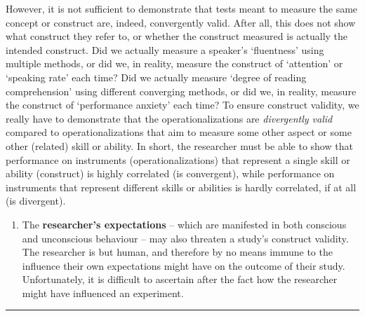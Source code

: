 \documentclass[
]{book}
\providecommand{\tightlist}{%
  \setlength{\itemsep}{0pt}\setlength{\parskip}{0pt}}
\begin{document}
However, it is not sufficient to demonstrate that tests meant to measure the same concept or construct are, indeed, convergently valid. After all, this does not show what construct they refer to, or whether the construct measured is actually the intended construct. Did we actually measure a speaker's `fluentness' using multiple methods, or did we, in reality, measure the construct of `attention' or `speaking rate' each time? Did we actually measure `degree of reading comprehension' using different converging methods, or did we, in reality, measure the construct of `performance anxiety' each time? To ensure construct validity, we really have to demonstrate that the operationalizations are \emph{divergently valid} compared to operationalizations that aim to measure some other aspect or some other (related) skill or ability. In short, the researcher must be able to show that performance on instruments (operationalizations) that represent a single skill or ability (construct) is highly correlated (is convergent), while performance on instruments that represent different skills or abilities is hardly correlated, if at all (is divergent).

\begin{enumerate}
\def\labelenumi{\arabic{enumi}.}
\setcounter{enumi}{1}
\tightlist
\item
  The \textbf{researcher's expectations} -- which are manifested in both conscious and unconscious behaviour -- may also threaten a study's construct validity. The researcher is but human, and therefore by no means immune to the influence their own expectations might have on the outcome of their study. Unfortunately, it is difficult to ascertain after the fact how the researcher might have influenced an experiment.
\end{enumerate}

\begin{center}\rule{0.5\linewidth}{0.5pt}\end{center}
\end{document}
